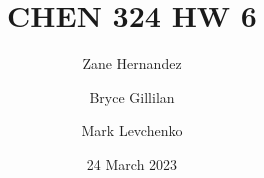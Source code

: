 \documentclass[12pt]{article}
\title{CHEN 324 HW 6}
\author[1]{Zane Hernandez}
\author[2]{Bryce Gillilan}
\author[3]{Mark Levchenko}
\affil[1,2,3]{Group 11}
\date{24 March 2023}
\begin{document}
\begin{enumerate}

    
    
    
    
    

    

    
    

\end{enumerate}
\end{document}
